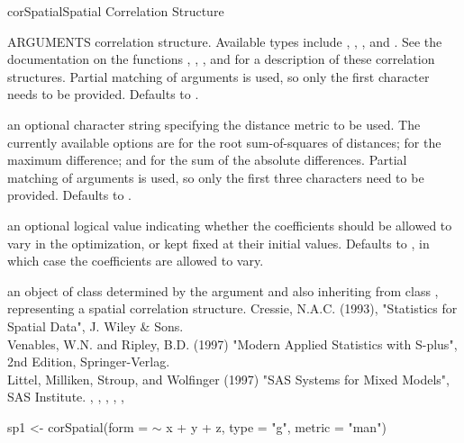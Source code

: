 \documentclass[pdftex]{article} \usepackage{url,graphicx}
\renewcommand{\Twiddle}{\mbox{\(\sim\)}}
\begin{document}
\begin{Helpfile}{corSpatial}{Spatial Correlation Structure}
\begin{Argument}{ARGUMENTS}
correlation structure. Available types include ,
, , and . See the
documentation on the functions , ,
, and  for a description of these
correlation structures. Partial matching of arguments is used, so
only the first character needs to be provided. Defaults to
.
\item[\Co{metric:}]
an optional character string specifying the distance
metric to be used. The currently available options are
 for the root sum-of-squares of distances;
 for the maximum difference; and 
for the sum of the absolute differences. Partial matching of
arguments is used, so only the first three characters need to be
provided. Defaults to .
\item[\Co{fixed:}]
an optional logical value indicating whether the
coefficients should be allowed to vary in the optimization, or kept
fixed at their initial values. Defaults to , in which case
the coefficients are allowed to vary.
\end{Argument}
an object of class determined by the  argument and also
inheriting from class , representing a spatial
correlation structure.
  Cressie, N.A.C. (1993), "Statistics for Spatial Data", J. Wiley \& Sons.\\
Venables, W.N. and Ripley, B.D. (1997) "Modern Applied Statistics with
S-plus", 2nd Edition, Springer-Verlag.\\
Littel, Milliken, Stroup, and Wolfinger (1997) "SAS Systems for Mixed
Models", SAS Institute.
, ,
, ,
, 
\need 15pt
\vspace{-16pt}
\begin{Example}
sp1 <- corSpatial(form = {\Twiddle} x + y + z, type = "g", metric = "man")
\end{Example}
\end{Helpfile}
\end{document}

